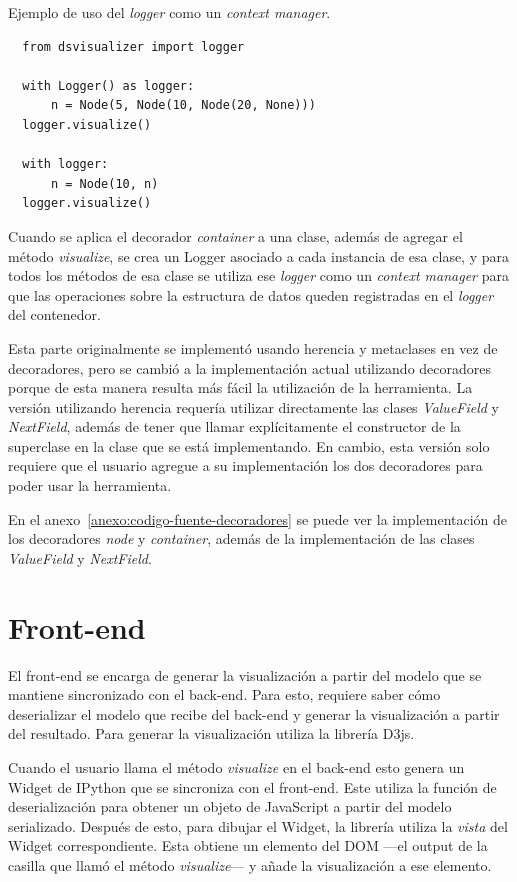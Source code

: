 \begin{listing}[h!]
  \caption{Ejemplo de uso del \textit{logger} como un \textit{context manager}.}
  \label{lst:ejemplo-logger-ctx-mgr}
  \begin{verbatim}
  from dsvisualizer import logger
  
  with Logger() as logger:
      n = Node(5, Node(10, Node(20, None)))
  logger.visualize()
  
  with logger:
      n = Node(10, n)
  logger.visualize()
  \end{verbatim}
\end{listing}

Cuando se aplica el decorador \textit{container} a una clase, además de agregar el método \textit{visualize}, se crea un Logger asociado a cada instancia de esa clase, y para todos los métodos de esa clase se utiliza ese \textit{logger} como un \textit{context manager} para que las operaciones sobre la estructura de datos queden registradas en el \textit{logger} del contenedor.

Esta parte originalmente se implementó usando herencia y metaclases en vez de decoradores, pero se cambió a la implementación actual utilizando decoradores porque de esta manera resulta más fácil la utilización de la herramienta. La versión utilizando herencia requería utilizar directamente las clases \textit{ValueField} y \textit{NextField}, además de tener que llamar explícitamente el constructor de la superclase en la clase que se está implementando. En cambio, esta versión solo requiere que el usuario agregue a su implementación los dos decoradores para poder usar la herramienta.

En el anexo~\ref{anexo:codigo-fuente-decoradores} se puede ver la implementación de los decoradores \textit{node} y \textit{container}, además de la implementación de las clases \textit{ValueField} y \textit{NextField}.

\section{Front-end}

El front-end se encarga de generar la visualización a partir del modelo que se mantiene sincronizado con el back-end. Para esto, requiere saber cómo deserializar el modelo que recibe del back-end y generar la visualización a partir del resultado. Para generar la visualización utiliza la librería D3js.

Cuando el usuario llama el método \textit{visualize} en el back-end esto genera un Widget de IPython que se sincroniza con el front-end. Este utiliza la función de deserialización para obtener un objeto de JavaScript a partir del modelo serializado. Después de esto, para dibujar el Widget, la librería utiliza la \textit{vista} del Widget correspondiente. Esta obtiene un elemento del DOM ---el output de la casilla que llamó el método \textit{visualize}--- y añade la visualización a ese elemento.

